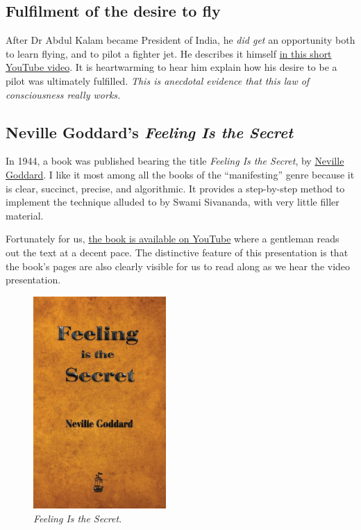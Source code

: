 \documentclass[
  a4paper,
]{article}
\begin{document}
\subsection{Fulfilment of the desire to
fly}\label{fulfilment-of-the-desire-to-fly}

After Dr Abdul Kalam became President of India, he \emph{did get} an
opportunity both to learn flying, and to pilot a fighter jet. He
describes it himself
\href{https://www.youtube.com/shorts/kWnxd3af4rM}{in this short YouTube
video}. It is heartwarming to hear him explain how his desire to be a
pilot was ultimately fulfilled. \emph{This is anecdotal evidence that
this law of consciousness really works.}

\subsection{\texorpdfstring{Neville Goddard's \emph{Feeling Is the
Secret}}{Neville Goddard's Feeling Is the Secret}}\label{neville-goddards-feeling-is-the-secret}

In 1944, a book was published bearing the title \emph{Feeling Is the
Secret}, by \href{feeling\%20is\%20the\%20secret}{Neville Goddard}. I
like it most among all the books of the ``manifesting'' genre because it
is clear, succinct, precise, and algorithmic. It provides a step-by-step
method to implement the technique alluded to by Swami Sivananda, with
very little filler material.

Fortunately for us,
\href{https://www.youtube.com/watch?v=ffNWoefuwPM}{the book is available
on YouTube} where a gentleman reads out the text at a decent pace. The
distinctive feature of this presentation is that the book's pages are
also clearly visible for us to read along as we hear the video
presentation.

\begin{figure}
\centering
\includegraphics[width=0.45\textwidth,height=\textheight]{images/Feeling-is-the-Secret.jpg}
\caption{\emph{Feeling Is the Secret}.}
\end{figure}
\end{document}
